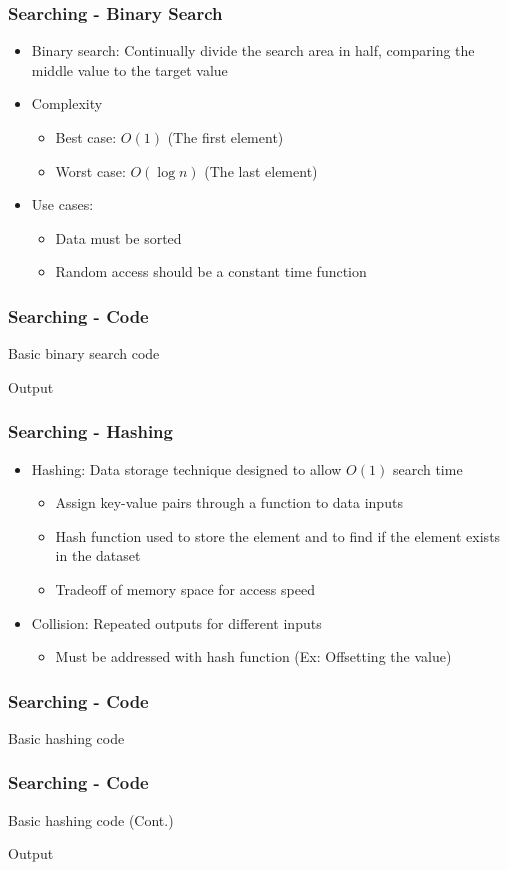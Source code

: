 \begin{frame}\frametitle{Searching - Binary Search}
\begin{itemize}
\item Binary search: Continually divide the search area in half, comparing the middle value to the target value
\item Complexity
	\begin{itemize}
	\item Best case: $O(1)$ (The first element)
	\item Worst case: $O(\log n)$ (The last element)
	\end{itemize}
\item Use cases:
	\begin{itemize}
	\item Data must be sorted
	\item Random access should be a constant time function
	\end{itemize}
\end{itemize}
\end{frame}

\begin{frame}\frametitle{Searching - Code}
Basic binary search code


Output

\end{frame}

\begin{frame}\frametitle{Searching - Hashing}
\begin{itemize}
\item Hashing: Data storage technique designed to allow $O(1)$ search time
	\begin{itemize}
	\item Assign key-value pairs through a function to data inputs
	\item Hash function used to store the element and to find if the element exists in the dataset
	\item Tradeoff of memory space for access speed
	\end{itemize}
\item Collision: Repeated outputs for different inputs
	\begin{itemize}
	\item Must be addressed with hash function (Ex: Offsetting the value)
	\end{itemize}
\end{itemize}
\end{frame}

\begin{frame}\frametitle{Searching - Code}
Basic hashing code

\end{frame}

\begin{frame}\frametitle{Searching - Code}
Basic hashing code (Cont.)

Output

\end{frame}

